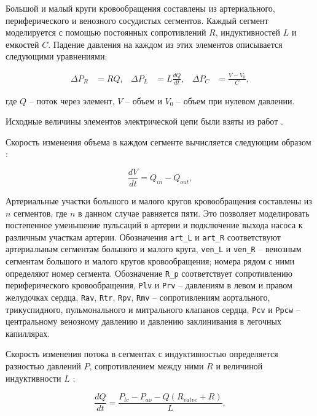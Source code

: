 Большой и малый круги кровообращения составлены из артериального, периферического и венозного сосудистых сегментов. Каждый сегмент моделируется с помощью постоянных сопротивлений $R$, индуктивностей $L$ и емкостей $C$. Падение давления на каждом из этих элементов описывается следующими уравнениями:

\begin{equation}
\begin{aligned}
\Delta P_R &= RQ, & \Delta P_L &= L\frac{dQ}{dt}, & \Delta P_C &= \frac{V-V_0}{C},
\end{aligned}
\end{equation}

\noindent где $Q$ -- поток через элемент, $V$ -- объем и $V_0$ -- объем при нулевом давлении. 

Исходные величины элементов электрической цепи были взяты из работ \cite{Cox_2009, Martina_2013_simulation}.  %

Скорость изменения объема в каждом сегменте вычисляется следующим образом \cite{smith2005experimentally}:

\begin{equation}
	\frac{ dV }{dt} =Q_{in} - Q_{out},
\end{equation}

Артериальные участки большого и малого кругов кровообращения составлены из $n$ сегментов, где $n$ в данном случае равняется пяти. Это позволяет моделировать постепенное уменьшение пульсаций в артерии и подключение выхода насоса к различным участкам артерии. Обозначения \verb!art_L! и \verb!art_R! соответствуют артериальным сегментам большого и малого круга, \verb!ven_L! и \verb!ven_R! -- венозным сегментам большого и малого кругов кровообращения; номера рядом с ними определяют номер сегмента. Обозначение \verb!R_p! соответствует сопротивлению периферического кровообращения, \verb!Plv! и \verb!Prv! -- давлениям в левом и правом желудочках сердца, \verb!Rav!, \verb!Rtr!, \verb!Rpv!, \verb!Rmv! -- сопротивлениям аортального, трикуспидного, пульмонального и митрального клапанов сердца, \verb!Pcv! и \verb!Ppcw! -- центральному венозному давлению и давлению заклинивания в легочных капиллярах.

Скорость изменения потока в сегментах с индуктивностью определяется разностью давлений $P$, сопротивлением между ними $R$ и величиной индуктивности $L$ \cite{smith2005experimentally}:

\begin{equation}
	\frac{ dQ }{dt} = \frac{ P_{lv} - P_{ao} - Q(R_{valve} + R) }{ L },
\end{equation}

